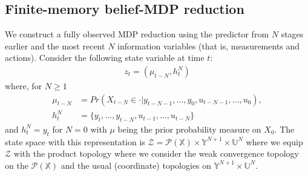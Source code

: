 \documentclass[letterpaper, 10 pt, conference]{ieeeconf}  %
\def\P{{\mathcal P}}
\theoremstyle{definition}
\newtheorem{definition}{Definition}
\theoremstyle{remark}
\begin{document}
\subsection{Finite-memory belief-MDP reduction}\label{alt_sec}
 We construct a fully observed MDP reduction using the predictor from $N$ stages earlier and the most recent $N$ information variables (that is, measurements and actions). 
Consider the following state variable at time $t$:
\begin{align}\label{finite_belief_state}
{z}_t=(\mu_{t-N},h_t^N)
\end{align}
where, for $N\geq 1$
\begin{align*}
\mu_{t-N}&=Pr(X_{t-N}\in \cdot|y_{t-N-1},\dots,y_0,u_{t-N-1},\dots,u_0),\\
h_t^N&=\{y_t,\dots,y_{t-N},u_{t-1},\dots,u_{t-N}\}
\end{align*}
and $h_t^N=y_t$ for $N=0$
with $\mu$ being the prior probability measure on $X_0$. The state space with this representation is ${\mathcal{Z}}=\P(\mathds{X})\times \mathds{Y}^{N+1}\times \mathds{U}^{N}$ where we equip ${\mathcal{Z}}$ with the product topology where we consider the weak convergence topology on the $\P(\mathds{X})$ and the usual (coordinate) topologies on $\mathds{Y}^{N+1}\times \mathds{U}^{N}$. 
\end{document}

